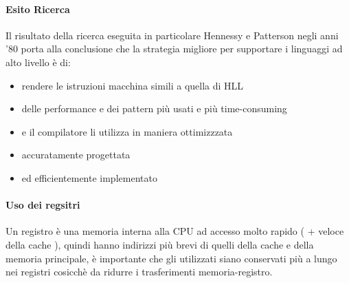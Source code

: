 \documentclass[arch.tex]{subfiles}
\begin{document}
\paragraph{Esito Ricerca}%
\label{par:esito_ricerca}
Il risultato della ricerca eseguita in particolare Hennessy e Patterson negli anni '80 porta 
alla conclusione che la strategia migliore per supportare i linguaggi ad alto livello è di:

\begin{itemize}
	\item {} rendere le istruzioni macchina simili a quella di HLL
	\item {} delle performance e dei pattern più usati e 
		più time-consuming
	\item {} e il compilatore li utilizza in maniera 
		ottimizzzata
	\item {} accuratamente progettata
	\item {} ed efficientemente implementato
\end{itemize}

\paragraph{Uso dei regsitri}%
\label{par:uso_dei_regsitri}
Un registro è una memoria interna alla CPU ad accesso molto rapido ( + veloce della cache ), 
quindi hanno indirizzi più brevi di quelli della cache e della memoria principale,
è importante che gli  utilizzati siano conservati più a lungo nei registri
cosicchè da ridurre i trasferimenti memoria-registro.
\end{document}
